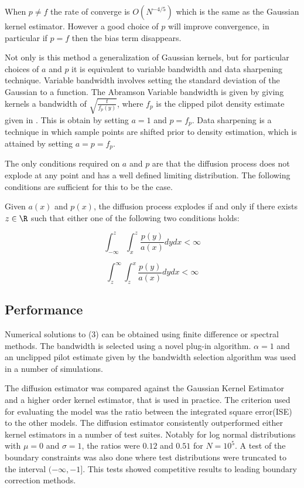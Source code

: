When $p \neq f$ the rate of converge is $O(N^{-4/5})$ which is the same as the Gaussian kernel estimator. However a good choice of $p$ will improve convergence, in particular if $p = f$ then the bias term disappears.

Not only is this method a generalization of Gaussian kernels, but for particular choices of $a$ and $p$ it is equivalent to variable bandwidth and data sharpening technique. Variable bandwidth involves setting the standard deviation of the Gaussian to a function. The Abramson Variable bandwidth is given by giving kernels a bandwidth of $\sqrt{\frac{t}{f_p(y)}}$, where $f_p$ is the clipped pilot density estimate given in \cite{abramson1982bandwidth}. This is obtain by setting $a=1$ and $p = f_p$. Data sharpening is a technique in which sample points are shifted prior to density estimation, which is attained by setting $a = p = f_p$.

The only conditions required on $a$ and $p$ are that the diffusion process does not explode at any point and has a well defined limiting distribution. The following conditions are sufficient for this to be the case. 

\begin{theorem}
Given $a(x)$ and $p(x)$, the diffusion process explodes if and only if there exists $z \in \R$ such that either one of the following two conditions holds:

$$
\int_{-\infty}^{z} \int_{x}^{z} \frac{p(y)}{a(x)} d y d x<\infty
$$

$$
\int_{z}^{\infty} \int_{z}^{x} \frac{p(y)}{a(x)} d y d x<\infty
$$

\end{theorem}  

\subsection{Performance}
Numerical solutions to (3) can be obtained using finite difference or spectral methods. The bandwidth is selected using a novel plug-in algorithm. $\alpha = 1$ and an unclipped pilot estimate given by the bandwidth selection algorithm was used in a number of simulations.

The diffusion estimator was compared against the Gaussian Kernel Estimator and a higher order kernel estimator, that is used in practice. The criterion used for evaluating the model was the ratio between the integrated square error(ISE) to the other models. The diffusion estimator consistently outperformed either kernel estimators in a number of test suites. Notably for log normal distributions with $\mu = 0$ and $\sigma = 1$, the ratios were $0.12$ and $0.51$ for $N = 10^5$. A test of the boundary constraints was also done where test distributions were truncated to the interval $(-\infty, -1]$. This tests showed competitive results to leading boundary correction methods.

